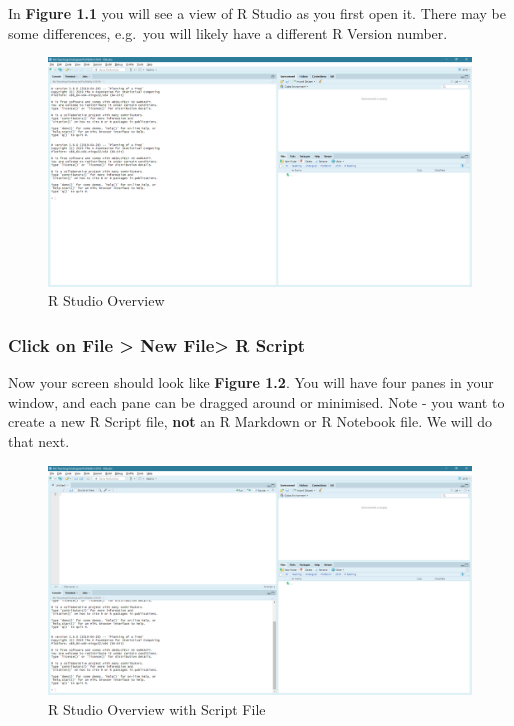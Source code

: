 \documentclass[
]{book}
\begin{document}
In \textbf{Figure 1.1} you will see a view of R Studio as you first open it. There may be some differences, e.g.~you will likely have a different R Version number.

\begin{figure}

{\centering \includegraphics[width=24.07in]{images/02_install/rstud01} 

}

\caption{R Studio Overview}\label{fig:unnamed-chunk-9}
\end{figure}

\hypertarget{click-on-file-new-file-r-script}{%
\subsubsection{Click on File \textgreater{} New File\textgreater{} R Script}\label{click-on-file-new-file-r-script}}

Now your screen should look like \textbf{Figure 1.2}. You will have four panes in your window, and each pane can be dragged around or minimised. Note - you want to create a new R Script file, \textbf{not} an R Markdown or R Notebook file. We will do that next.

\begin{figure}

{\centering \includegraphics[width=24.81in]{images/02_install/rstud02} 

}

\caption{R Studio Overview with Script File}\label{fig:unnamed-chunk-10}
\end{figure}
\end{document}
